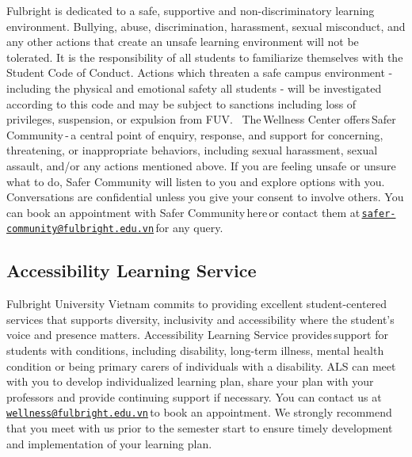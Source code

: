 \documentclass[
]{article}
\begin{document}
Fulbright is dedicated to a safe, supportive and non-discriminatory learning environment. Bullying, abuse, discrimination, harassment, sexual misconduct, and any other actions that create an unsafe learning environment will not be tolerated. It is the responsibility of all students to familiarize themselves with the\,Student Code of Conduct. Actions which threaten a safe campus environment - including the physical and emotional safety all students - will be investigated according to this code and may be subject to sanctions including loss of privileges, suspension, or expulsion from FUV.
\,
The\,Wellness Center offers\,Safer Community\,-\,a central point of enquiry, response, and support for concerning, threatening, or inappropriate behaviors, including sexual harassment, sexual assault, and/or any actions mentioned above. If you are feeling unsafe or unsure what to do, Safer Community will listen to you and explore options with you. Conversations are confidential unless you give your consent to involve others. You can book an appointment with Safer Community\,here\,or contact them at\,\href{mailto:safer-community@fulbright.edu.vn}{\nolinkurl{safer-community@fulbright.edu.vn}}\,for any query.

\subsection*{Accessibility Learning Service}\label{accessibility-learning-service}

Fulbright University Vietnam commits to providing excellent student-centered services that supports diversity, inclusivity and accessibility where the student's voice and presence matters. Accessibility Learning Service provides\,support for students with conditions, including disability, long-term illness, mental health condition or being primary carers of individuals with a disability. ALS can meet with you to develop individualized learning plan, share your plan with your professors and provide continuing support if necessary. You can contact us at\,\href{mailto:wellness@fulbright.edu.vn}{\nolinkurl{wellness@fulbright.edu.vn}}\,to book an appointment. We strongly recommend that you meet with us prior to the semester start to ensure timely development and implementation of your learning plan.
\end{document}

